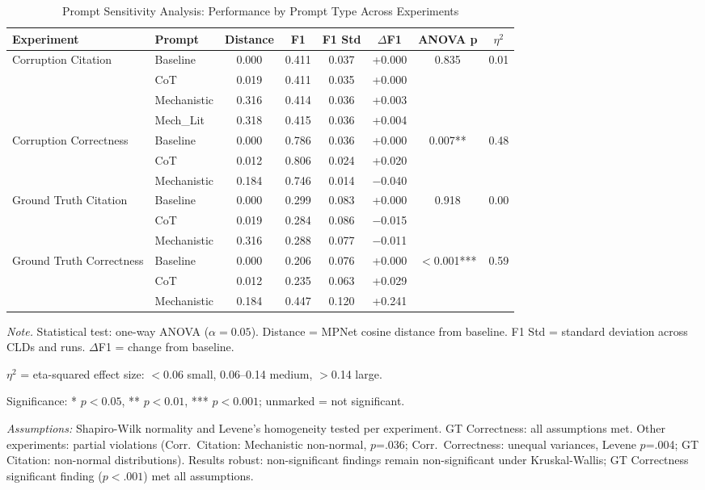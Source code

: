 \begin{table}[H]
\centering
\caption{Prompt Sensitivity Analysis: Performance by Prompt Type Across Experiments}
\label{tab:prompt_sensitivity}
\begin{threeparttable}
\begin{tabular}{llcccccc}
\toprule
\textbf{Experiment} & \textbf{Prompt} & \textbf{Distance} & \textbf{F1} & \textbf{F1 Std} & \textbf{$\Delta$F1} & \textbf{ANOVA p} & \textbf{$\eta^2$} \\
\midrule
Corruption Citation & Baseline & 0.000 & 0.411 & 0.037 & +0.000 & 0.835 & 0.01 \\
 & CoT & 0.019 & 0.411 & 0.035 & +0.000 &  & \\
 & Mechanistic & 0.316 & 0.414 & 0.036 & +0.003 &  & \\
 & Mech\_Lit & 0.318 & 0.415 & 0.036 & +0.004 &  & \\
\midrule
Corruption Correctness & Baseline & 0.000 & 0.786 & 0.036 & +0.000 & 0.007** & 0.48 \\
 & CoT & 0.012 & 0.806 & 0.024 & +0.020 &  & \\
 & Mechanistic & 0.184 & 0.746 & 0.014 & $-$0.040 &  & \\
\midrule
Ground Truth Citation & Baseline & 0.000 & 0.299 & 0.083 & +0.000 & 0.918 & 0.00 \\
 & CoT & 0.019 & 0.284 & 0.086 & $-$0.015 &  & \\
 & Mechanistic & 0.316 & 0.288 & 0.077 & $-$0.011 &  & \\
\midrule
Ground Truth Correctness & Baseline & 0.000 & 0.206 & 0.076 & +0.000 & $<$0.001*** & 0.59 \\
 & CoT & 0.012 & 0.235 & 0.063 & +0.029 &  & \\
 & Mechanistic & 0.184 & 0.447 & 0.120 & +0.241 &  & \\
\bottomrule
\end{tabular}
\begin{tablenotes}
\small
\item \textit{Note.} Statistical test: one-way ANOVA ($\alpha=0.05$). Distance = MPNet cosine distance from baseline. F1 Std = standard deviation across CLDs and runs. $\Delta$F1 = change from baseline.
\item $\eta^2$ = eta-squared effect size: $<$0.06 small, 0.06--0.14 medium, $>$0.14 large.
\item Significance: * $p<0.05$, ** $p<0.01$, *** $p<0.001$; unmarked = not significant.
\item \textit{Assumptions:} Shapiro-Wilk normality and Levene's homogeneity tested per experiment. GT Correctness: all assumptions met. Other experiments: partial violations (Corr.\ Citation: Mechanistic non-normal, $p$=.036; Corr.\ Correctness: unequal variances, Levene $p$=.004; GT Citation: non-normal distributions). Results robust: non-significant findings remain non-significant under Kruskal-Wallis; GT Correctness significant finding ($p<.001$) met all assumptions.

\end{tablenotes}
\end{threeparttable}
\end{table}
